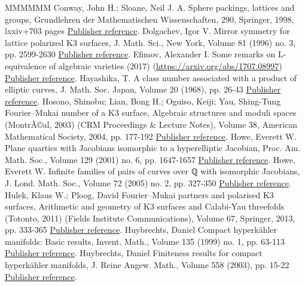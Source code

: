 \begin{thebibliography}{MMMMMM}
 Conway, John H.; Sloane, Neil J. A. Sphere packings, lattices and groups, Grundlehren der Mathematischen Wissenschaften, 290, Springer, 1998, lxxiv+703 pages \href{https://ahl.centre-mersenne.org/item/AHL_2018__1__227_0/#Conway}{Publisher reference}.
 Dolgachev, Igor V. Mirror symmetry for lattice polarized K3 surfaces, J. Math. Sci., New York, Volume 81 (1996) no. 3, pp. 2599-2630 \href{https://ahl.centre-mersenne.org/item/AHL_2018__1__227_0/#Dolg}{Publisher reference}.
 Efimov, Alexander I. Some remarks on L-equivalence of algebraic varieties (2017) (\url{https://arxiv.org/abs/1707.08997}) \href{https://ahl.centre-mersenne.org/item/AHL_2018__1__227_0/#Ef}{Publisher reference}.
 Hayashika, T. A class number associated with a product of elliptic curves, J. Math. Soc. Japan, Volume 20 (1968), pp. 26-43 \href{https://ahl.centre-mersenne.org/item/AHL_2018__1__227_0/#Hay}{Publisher reference}.
 Hosono, Shinobu; Lian, Bong H.; Oguiso, Keiji; Yau, Shing-Tung Fourier–Mukai number of a K3 surface, Algebraic structures and moduli spaces (MontrÃ©al, 2003) (CRM Proceedings \& Lecture Notes), Volume 38, American Mathematical Society, 2004, pp. 177-192 \href{https://ahl.centre-mersenne.org/item/AHL_2018__1__227_0/#Hosono}{Publisher reference}.
 Howe, Everett W. Plane quartics with Jacobians isomorphic to a hyperelliptic Jacobian, Proc. Am. Math. Soc., Volume 129 (2001) no. 6, pp. 1647-1657 \href{https://ahl.centre-mersenne.org/item/AHL_2018__1__227_0/#Howe1}{Publisher reference}.
 Howe, Everett W. Infinite families of pairs of curves over ℚ with isomorphic Jacobians, J. Lond. Math. Soc., Volume 72 (2005) no. 2, pp. 327-350 \href{https://ahl.centre-mersenne.org/item/AHL_2018__1__227_0/#Howe2}{Publisher reference}.
 Hulek, Klaus W.; Ploog, David Fourier–Mukai partners and polarised K3 surfaces, Arithmetic and geometry of K3 surfaces and Calabi-Yau threefolds (Totonto, 2011) (Fields Institute Communications), Volume 67, Springer, 2013, pp. 333-365 \href{https://ahl.centre-mersenne.org/item/AHL_2018__1__227_0/#HP}{Publisher reference}.
 Huybrechts, Daniel Compact hyperkähler manifolds: Basic results, Invent. Math., Volume 135 (1999) no. 1, pp. 63-113 \href{https://ahl.centre-mersenne.org/item/AHL_2018__1__227_0/#HuyHK}{Publisher reference}.
 Huybrechts, Daniel Finiteness results for compact hyperkähler manifolds, J. Reine Angew. Math., Volume 558 (2003), pp. 15-22 \href{https://ahl.centre-mersenne.org/item/AHL_2018__1__227_0/#HuyFin}{Publisher reference}.

\end{thebibliography}
